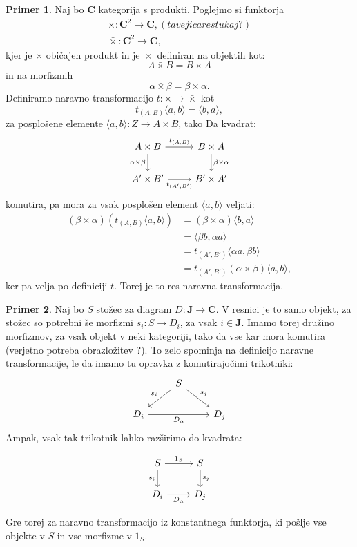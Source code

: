 \documentclass[12pt,a4paper]{book}
\theoremstyle{definition}
\theoremstyle{plain}
\theoremstyle{definition}
\newtheorem{primer}{Primer}[section]
\theoremstyle{remark}
\newcommand{\cat}[1]{\textbf{#1}}
\begin{document}
\begin{primer}
Naj bo \cat{C} kategorija s produkti. Poglejmo si funktorja
\begin{align*}
\times : \cat{C}^2 \to \cat{C}, (ta vejica res tukaj ?)\\
\bar{\times} : \cat{C}^2 \to \cat{C},
\end{align*}
kjer je $\times$ običajen produkt in je $\bar{\times}$ definiran na objektih kot:
$$ A \bar{\times} B = B \times A$$
in na morfizmih
$$ \alpha \bar{\times} \beta = \beta \times \alpha.$$
Definiramo naravno transformacijo $t : \times \to \bar{\times}$ kot
$$t_{(A,B)}\langle a,b \rangle = \langle b,a \rangle,$$
za posplošene elemente $\langle a,b \rangle : Z \to A \times B$, tako
Da kvadrat:
$$ \begin{tikzcd}
A \times B \ar[d, "\alpha \times \beta"'] \ar[r, "t_{(A,B)}"] & B \times A \ar[d, "\beta \times \alpha"] \\
A' \times B' \ar[r, "t_{(A',B')}"'] & B' \times A'
\end{tikzcd} $$
komutira, pa mora za vsak posplošen element $\langle a,b \rangle$ veljati:
\begin{align*}
(\beta \times \alpha)(t_{(A,B)}\langle a,b \rangle ) &= (\beta \times \alpha)\langle b,a \rangle \\
& = \langle \beta b,\alpha a \rangle \\
& = t_{(A',B')}\langle \alpha a, \beta b \rangle \\
& = t_{(A', B')}(\alpha \times \beta)\langle a,b \rangle,
\end{align*}
ker pa velja po definiciji $t$. Torej je to res naravna transformacija.
\end{primer}

\begin{primer}
Naj bo $S$ stožec za diagram $D : \cat{J} \to \cat{C}$. V resnici je to samo objekt, za stožec so potrebni še morfizmi $s_i : S \to D_i$, za vsak $i \in \cat{J}$. Imamo torej družino morfizmov, za vsak objekt v neki kategoriji, tako da vse kar mora komutira (verjetno potreba obrazložitev ?). To zelo spominja na definicijo naravne transformacije, le da imamo tu opravka z komutirajočimi trikotniki:
$$ \begin{tikzcd}
& S \ar[dl, "s_i"'] \ar[dr, "s_j"] & \\
D_i \ar[rr, "D_\alpha"'] & & D_j
\end{tikzcd} $$
Ampak, vsak tak trikotnik lahko razširimo do kvadrata:

$$ \begin{tikzcd}
S \ar[d, "s_i"'] \ar[r, "1_S"] & S \ar[d, "s_j"]\\
D_i \ar[r, "D_\alpha"'] & D_j
\end{tikzcd} $$

Gre torej za naravno transformacijo iz konstantnega funktorja, ki pošlje vse objekte v $S$ in vse morfizme v $1_S$.
\end{primer}
\end{document}
